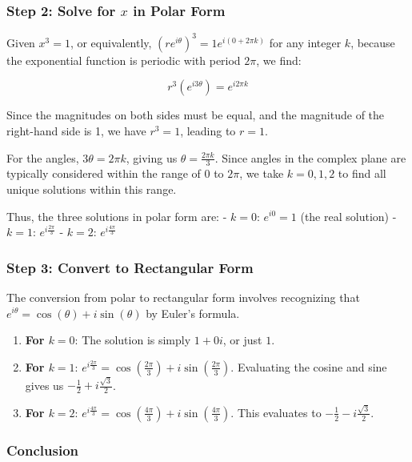 \documentclass[
]{article}
\begin{document}
\subsubsection{\texorpdfstring{Step 2: Solve for \(x\) in Polar
Form}{Step 2: Solve for x in Polar Form}}\label{step-2-solve-for-x-in-polar-form}

Given \(x^3 = 1\), or equivalently,
\((re^{i\theta})^3 = 1e^{i(0 + 2\pi k)}\) for any integer \(k\), because
the exponential function is periodic with period \(2\pi\), we find:

\[r^3(e^{i3\theta}) = e^{i2\pi k}\]

Since the magnitudes on both sides must be equal, and the magnitude of
the right-hand side is 1, we have \(r^3 = 1\), leading to \(r = 1\).

For the angles, \(3\theta = 2\pi k\), giving us
\(\theta = \frac{2\pi k}{3}\). Since angles in the complex plane are
typically considered within the range of \(0\) to \(2\pi\), we take
\(k = 0, 1, 2\) to find all unique solutions within this range.

Thus, the three solutions in polar form are: - \(k = 0\): \(e^{i0} = 1\)
(the real solution) - \(k = 1\): \(e^{i\frac{2\pi}{3}}\) - \(k = 2\):
\(e^{i\frac{4\pi}{3}}\)

\subsubsection{Step 3: Convert to Rectangular
Form}\label{step-3-convert-to-rectangular-form}

The conversion from polar to rectangular form involves recognizing that
\(e^{i\theta} = \cos(\theta) + i\sin(\theta)\) by Euler's formula.

\begin{enumerate}
\def\labelenumi{\arabic{enumi}.}
\item
  \textbf{For \(k = 0\)}: The solution is simply \(1 + 0i\), or just
  \(1\).
\item
  \textbf{For \(k = 1\)}:
  \(e^{i\frac{2\pi}{3}} = \cos\left(\frac{2\pi}{3}\right) + i\sin\left(\frac{2\pi}{3}\right)\).
  Evaluating the cosine and sine gives us
  \(-\frac{1}{2} + i\frac{\sqrt{3}}{2}\).
\item
  \textbf{For \(k = 2\)}:
  \(e^{i\frac{4\pi}{3}} = \cos\left(\frac{4\pi}{3}\right) + i\sin\left(\frac{4\pi}{3}\right)\).
  This evaluates to \(-\frac{1}{2} - i\frac{\sqrt{3}}{2}\).
\end{enumerate}

\subsubsection{Conclusion}\label{conclusion-1}
\end{document}
